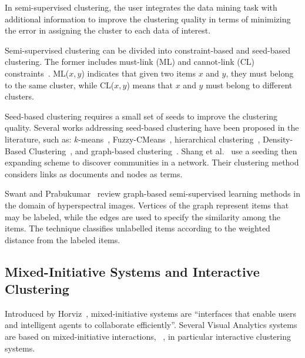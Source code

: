 In semi-supervised clustering, the user integrates the data mining task with additional information to improve the clustering quality in terms of minimizing the error in assigning the cluster to each data of interest.

Semi-supervised clustering can be divided into constraint-based and seed-based clustering.
The former includes must-link (ML) and cannot-link (CL) constraints~\cite{basuConstrainedClusteringAdvances2008, wagstaff2001constrained}. ML($x,y$) indicates that given two items $x$ and $y$, they must belong to the same cluster, while CL($x,y$) means that $x$ and $y$ must belong to different clusters.

Seed-based clustering requires a small set of seeds to improve the clustering quality. Several works addressing seed-based clustering have been proposed in the literature, such as: $k$-means~\cite{basuConstrainedClusteringAdvances2008}, Fuzzy-CMeans~\cite{bensaidPartiallySupervisedClustering1996}, hierarchical clustering~\cite{bohm08}, Density-Based Clustering~\cite{lelisSemisupervisedDensityBasedClustering2009}, and graph-based clustering~\cite{wagstaff2001constrained}.
Shang et al.~\cite{shangEfficientlyDetectingOverlapping2017} use a seeding then expanding scheme to discover communities in a network. Their clustering method considers links as documents and nodes as terms.

Swant and Prabukumar~\cite{SAWANT2018} review graph-based semi-supervised learning methods in the domain of hyperspectral images.
Vertices of the graph represent items that may be labeled, while the edges are used to specify the similarity among the items.
The technique classifies unlabelled items according to the weighted distance from the labeled items.

\subsection{Mixed-Initiative Systems and Interactive Clustering}

Introduced by Horviz~\cite{horvitzPrinciplesMixedinitiativeUser1999}, mixed-initiative systems are ``interfaces that enable users and intelligent agents to collaborate efficiently''. Several Visual Analytics systems are based on mixed-initiative interactions, \eg~\cite{makoninMixedInitiativeBigData2016, cookMixedinitiativeVisualAnalytics2015, zhou13, wallPodiumRankingData2018}, in particular interactive clustering systems.

